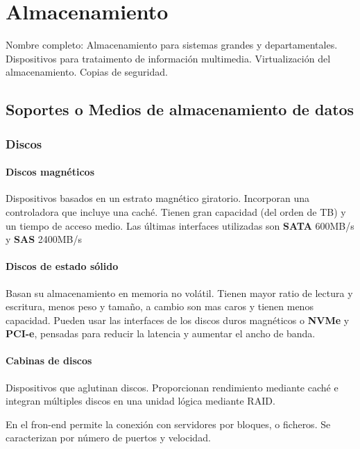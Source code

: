 \setcounter{section}{55} %
\section{Almacenamiento}

Nombre completo: Almacenamiento para sistemas grandes y departamentales. Dispositivos para trataimento de información multimedia. Virtualización del almacenamiento. Copias de seguridad.

\localtableofcontents

\subsection{Soportes o Medios de almacenamiento de datos}
    \subsubsection{Discos}
        \paragraph{Discos magnéticos}
            Dispositivos basados en un estrato magnético giratorio. Incorporan una controladora que incluye una caché. Tienen gran capacidad (del orden de TB) y un tiempo de acceso medio. Las últimas interfaces utilizadas son \textbf{SATA} 600MB/s y \textbf{SAS} 2400MB/s

        \paragraph{Discos de estado sólido}
            Basan su almacenamiento en memoria no volátil. Tienen mayor ratio de lectura y escritura, menos peso y tamaño, a cambio son mas caros y tienen menos capacidad. Pueden usar las interfaces de los discos duros magnéticos o \textbf{NVMe} y \textbf{PCI-e}, pensadas para reducir la latencia y aumentar el ancho de banda.

        \paragraph{Cabinas de discos}
            Dispositivos que aglutinan discos. Proporcionan rendimiento mediante caché e integran múltiples discos en una unidad lógica mediante RAID.

            En el fron-end permite la conexión con servidores por bloques, o ficheros. Se caracterizan por número de puertos y velocidad.

